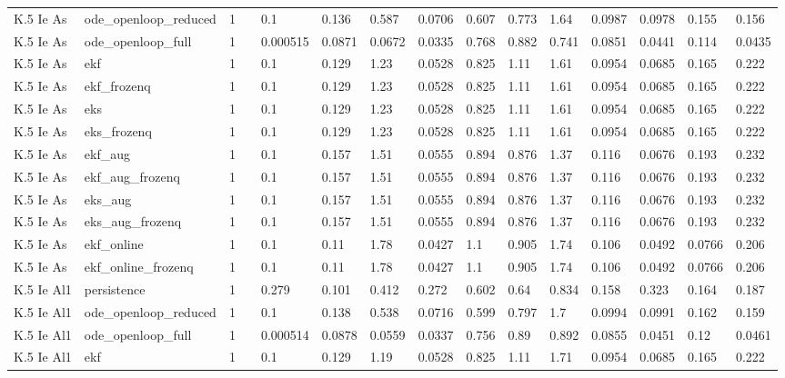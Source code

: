 \begin{table}[t]
\begin{tabular}{lllllllllllllll}
K.5 Ie As & ode\_openloop\_reduced & 1 &  & 0.1 & 0.136 & 0.587 & 0.0706 & 0.607 & 0.773 & 1.64 & 0.0987 & 0.0978 & 0.155 & 0.156 \\
K.5 Ie As & ode\_openloop\_full & 1 &  & 0.000515 & 0.0871 & 0.0672 & 0.0335 & 0.768 & 0.882 & 0.741 & 0.0851 & 0.0441 & 0.114 & 0.0435 \\
K.5 Ie As & ekf & 1 &  & 0.1 & 0.129 & 1.23 & 0.0528 & 0.825 & 1.11 & 1.61 & 0.0954 & 0.0685 & 0.165 & 0.222 \\
K.5 Ie As & ekf\_frozenq & 1 &  & 0.1 & 0.129 & 1.23 & 0.0528 & 0.825 & 1.11 & 1.61 & 0.0954 & 0.0685 & 0.165 & 0.222 \\
K.5 Ie As & eks & 1 &  & 0.1 & 0.129 & 1.23 & 0.0528 & 0.825 & 1.11 & 1.61 & 0.0954 & 0.0685 & 0.165 & 0.222 \\
K.5 Ie As & eks\_frozenq & 1 &  & 0.1 & 0.129 & 1.23 & 0.0528 & 0.825 & 1.11 & 1.61 & 0.0954 & 0.0685 & 0.165 & 0.222 \\
K.5 Ie As & ekf\_aug & 1 &  & 0.1 & 0.157 & 1.51 & 0.0555 & 0.894 & 0.876 & 1.37 & 0.116 & 0.0676 & 0.193 & 0.232 \\
K.5 Ie As & ekf\_aug\_frozenq & 1 &  & 0.1 & 0.157 & 1.51 & 0.0555 & 0.894 & 0.876 & 1.37 & 0.116 & 0.0676 & 0.193 & 0.232 \\
K.5 Ie As & eks\_aug & 1 &  & 0.1 & 0.157 & 1.51 & 0.0555 & 0.894 & 0.876 & 1.37 & 0.116 & 0.0676 & 0.193 & 0.232 \\
K.5 Ie As & eks\_aug\_frozenq & 1 &  & 0.1 & 0.157 & 1.51 & 0.0555 & 0.894 & 0.876 & 1.37 & 0.116 & 0.0676 & 0.193 & 0.232 \\
K.5 Ie As & ekf\_online & 1 &  & 0.1 & 0.11 & 1.78 & 0.0427 & 1.1 & 0.905 & 1.74 & 0.106 & 0.0492 & 0.0766 & 0.206 \\
K.5 Ie As & ekf\_online\_frozenq & 1 &  & 0.1 & 0.11 & 1.78 & 0.0427 & 1.1 & 0.905 & 1.74 & 0.106 & 0.0492 & 0.0766 & 0.206 \\
K.5 Ie Al1 & persistence & 1 &  & 0.279 & 0.101 & 0.412 & 0.272 & 0.602 & 0.64 & 0.834 & 0.158 & 0.323 & 0.164 & 0.187 \\
K.5 Ie Al1 & ode\_openloop\_reduced & 1 &  & 0.1 & 0.138 & 0.538 & 0.0716 & 0.599 & 0.797 & 1.7 & 0.0994 & 0.0991 & 0.162 & 0.159 \\
K.5 Ie Al1 & ode\_openloop\_full & 1 &  & 0.000514 & 0.0878 & 0.0559 & 0.0337 & 0.756 & 0.89 & 0.892 & 0.0855 & 0.0451 & 0.12 & 0.0461 \\
K.5 Ie Al1 & ekf & 1 &  & 0.1 & 0.129 & 1.19 & 0.0528 & 0.825 & 1.11 & 1.71 & 0.0954 & 0.0685 & 0.165 & 0.222 \\

\end{tabular}
\end{table}
